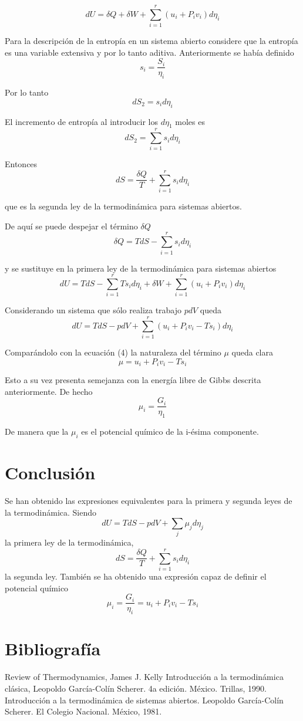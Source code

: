\documentclass[a4paper,12pt]{article}
\begin{document}
\[
	dU = \delta Q + \delta W + \sum_{i=1}^r (u_i + P_i v_i) d \eta_i
\]

Para la descripción de la entropía en un sistema abierto considere que la entropía es una variable extensiva y por lo tanto aditiva. Anteriormente se había definido
\[
	s_i = \frac{S_i}{\eta_i}
\]

Por lo tanto
\[
	d S_2 = s_i d \eta_i
\]

El incremento de entropía al introducir los $d \eta_1$ moles es
\[
	d S_2 = \sum_{i=1}^r s_i d \eta_i
\]

Entonces
\[
	d S = \frac{\delta Q}{T} + \sum_{i=1}^r s_i d \eta_i
\]

que es la segunda ley de la termodinámica para sistemas abiertos.

De aquí se puede despejar el término $\delta Q$
\[
	\delta Q = T dS - \sum_{i=1}^r s_i d \eta_i
\]

y se sustituye en la primera ley de la termodinámica para sistemas abiertos
\[
	dU = T dS - \sum_{i=1}^r T s_i d \eta_i + \delta W +  \sum_{i=1}^r (u_i + P_i v_i) d \eta_i
\]

Considerando un sistema que sólo realiza trabajo $p dV$ queda
\[
	dU = T dS - p dV + \sum_{i=1}^r (u_i + P_i v_i - Ts_i) d \eta_i
\]

Comparándolo con la ecuación (4) la naturaleza del término $\mu$ queda clara
\[
	\mu = u_i + P_i v_i - T s_i
\]

Esto a su vez presenta semejanza con la energía libre de Gibbs descrita anteriormente. De hecho
\[
	\mu_i = \frac{G_i}{\eta_1}
\]

De manera que la $\mu_i$ es el potencial químico de la i-ésima componente.

\section{Conclusión}
Se han obtenido las expresiones equivalentes para la primera y segunda leyes de la termodinámica. Siendo
\[
	d U = T dS - p dV + \sum_j \mu_j d \eta_j
\]
la primera ley de la termodinámica,
\[
	d S = \frac{\delta Q}{T} + \sum_{i=1}^r s_i d \eta_i
\]
la segunda ley. También se ha obtenido una expresión capaz de definir el potencial químico
\[
	\mu_i = \frac{G_i}{\eta_i} = u_i + P_i v_i - T s_i
\]


\section{Bibliografía}
\renewcommand*{\refname}{}
\begin{thebibliography}{100}
 Review of Thermodynamics, James J. Kelly
 Introducción a la termodinámica clásica, Leopoldo García-Colín Scherer. 4a edición. México. Trillas, 1990.
 Introducción a la termodinámica de sistemas abiertos. Leopoldo García-Colín Scherer. El Colegio Nacional. México, 1981.
\end{thebibliography}
\end{document}
